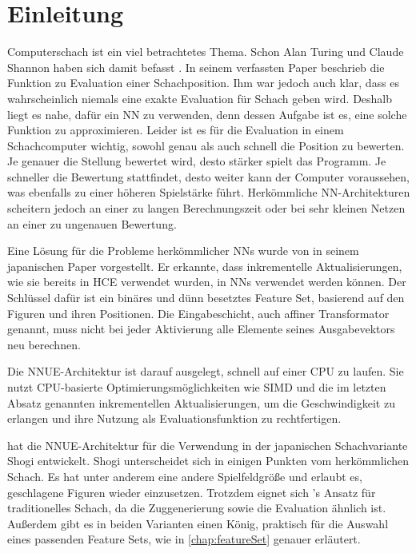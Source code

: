 \chapter{Einleitung}

Computerschach ist ein viel betrachtetes Thema. Schon Alan Turing und Claude Shannon haben sich damit befasst \cite{Turing1953, Shannon1950}. In seinem \citeyear{Shannon1950} verfassten Paper beschrieb \citeauthor{Shannon1950} \cite{Shannon1950} die Funktion zu Evaluation einer Schachposition. Ihm war jedoch auch klar, dass es wahrscheinlich niemals eine exakte Evaluation für Schach geben wird. Deshalb liegt es nahe, dafür ein \Ac{NN} zu verwenden, denn dessen Aufgabe ist es, eine solche Funktion zu approximieren. Leider ist es für die Evaluation in einem Schachcomputer wichtig, sowohl genau als auch schnell die Position zu bewerten. Je genauer die Stellung bewertet wird, desto stärker spielt das Programm. Je schneller die Bewertung stattfindet, desto weiter kann der Computer voraussehen, was ebenfalls zu einer höheren Spielstärke führt. Herkömmliche \ac{NN}-Architekturen scheitern jedoch an einer zu langen Berechnungszeit oder bei sehr kleinen Netzen an einer zu ungenauen Bewertung.

Eine Lösung für die Probleme herkömmlicher \acp{NN} wurde \citeyear{YNasu2018} von \citeauthor{YNasu2018} \cite{YNasu2018} in seinem japanischen Paper vorgestellt. Er erkannte, dass inkrementelle Aktualisierungen, wie sie bereits in \ac{HCE} verwendet wurden, in \acp{NN} verwendet werden können. Der Schlüssel dafür ist ein binäres und dünn besetztes Feature Set, basierend auf den Figuren und ihren Positionen. Die Eingabeschicht, auch affiner Transformator genannt, muss nicht bei jeder Aktivierung alle Elemente seines Ausgabevektors neu berechnen.

Die \ac{NNUE}-Architektur ist darauf ausgelegt, schnell auf einer CPU zu laufen. Sie nutzt CPU-basierte Optimierungsmöglichkeiten wie \ac{SIMD} und die im letzten Absatz genannten inkrementellen Aktualisierungen, um die Geschwindigkeit zu erlangen und ihre Nutzung als Evaluationsfunktion zu rechtfertigen.

\citeauthor{YNasu2018} \cite{YNasu2018} hat die \ac{NNUE}-Architektur für die Verwendung in der japanischen Schachvariante Shogi entwickelt. Shogi unterscheidet sich in einigen Punkten vom herkömmlichen Schach. Es hat unter anderem eine andere Spielfeldgröße und erlaubt es, geschlagene Figuren wieder einzusetzen. Trotzdem eignet sich \citeauthor{YNasu2018}'s \cite{YNasu2018} Ansatz für traditionelles Schach, da die Zuggenerierung sowie die Evaluation ähnlich ist. Außerdem gibt es in beiden Varianten einen König, praktisch für die Auswahl eines passenden Feature Sets, wie in \autoref{chap:featureSet} genauer erläutert.

